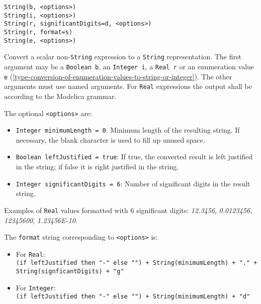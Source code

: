 \begin{operatordefinition*}[String]
\begin{synopsis}\begin{lstlisting}
String(b, <options>)
String(i, <options>)
String(r, significantDigits=d, <options>)
String(r, format=s)
String(e, <options>)
\end{lstlisting}\end{synopsis}
\begin{semantics}
Convert a scalar non-\lstinline!String! expression to a \lstinline!String! representation.  The first argument may be a \lstinline!Boolean b!, an \lstinline!Integer i!, a \lstinline!Real r! or an
enumeration value \lstinline!e! (\cref{type-conversion-of-enumeration-values-to-string-or-integer}).  The other arguments must use named arguments.  For \lstinline!Real! expressions the output shall be according to the Modelica grammar.

The optional \lstinline!<options>! are:
\begin{itemize}
\item
  \lstinline!Integer minimumLength = 0!: Minimum length of the resulting string.  If necessary, the blank character is used to fill up unused space.
\item
  \lstinline!Boolean leftJustified = true!: If true, the converted result is left justified in the string; if false it is right justified in the string.
\item
  \lstinline!Integer significantDigits = 6!: Number of significant digits in the result string.
\end{itemize}

\begin{nonnormative}
Examples of \lstinline!Real! values formatted with 6 significant digits: \emph{12.3456}, \emph{0.0123456}, \emph{12345600}, \emph{1.23456E-10}.
\end{nonnormative}

The \lstinline!format! string corresponding to \lstinline!<options>! is:
\begin{itemize}
\item
  For \lstinline!Real!:\\
  \lstinline!(if leftJustified then "-" else "") + String(minimumLength) + "." + String(signficantDigits) + "g"!
\item
  For \lstinline!Integer!:\\
  \lstinline!(if leftJustified then "-" else "") + String(minimumLength) + "d"!
\end{itemize}


\end{semantics}
\end{operatordefinition*}
